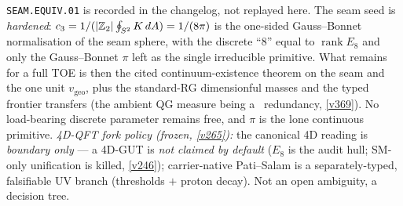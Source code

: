 \texttt{SEAM.EQUIV.01} is recorded in the changelog, not replayed here. The seam seed is \emph{hardened}:
$c_3=1/(|\mathbb{Z}_2|\oint_{S^2}K\,dA)=1/(8\pi)$ is the one-sided Gauss--Bonnet normalisation of the seam sphere,
with the discrete ``$8$'' equal to $\operatorname{rank}E_8$ and only the Gauss--Bonnet $\pi$ left as the
single irreducible primitive. What remains for a full TOE is then the cited continuum-existence theorem on
the seam and the one unit $v_{\mathrm{geo}}$, plus the standard-RG
dimensionful masses and the typed frontier transfers (the ambient QG measure being a \mC\ redundancy, \vref{v369}). No load-bearing discrete parameter remains free, and
$\pi$ is the lone continuous primitive. \emph{4D-QFT fork policy (frozen, \vref{v265}):} the canonical 4D
reading is \emph{boundary only} --- a 4D-GUT is \emph{not claimed by default} ($E_8$ is the audit hull;
SM-only unification is killed, \vref{v246}); carrier-native Pati--Salam is a separately-typed, falsifiable
UV branch (thresholds $+$ proton decay). Not an open ambiguity, a decision tree.

